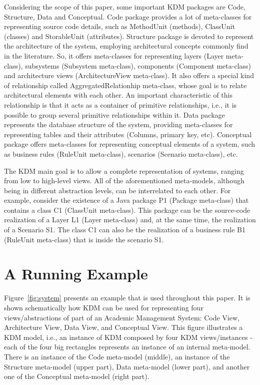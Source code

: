 Considering the scope of this paper, some important KDM packages are Code, Structure, Data and Conceptual. Code package provides a lot of meta-classes for representing source code details, such as MethodUnit (methods), ClassUnit (classes) and StorableUnit (attributes). Structure package is devoted to represent the architecture of the system, employing architectural concepts commonly find in the literature. So, it offers meta-classes for representing layers (Layer meta-class), subsystems (Subsystem meta-class), components (Component meta-class) and architecture views (ArchitectureView meta-class). It also offers a special kind of relationship called AggregatedRelationhip meta-class, whose goal is to relate architectural elements with each other. An important characteristic of this relationship is that it acts as a container of primitive relationships, i.e., it is possible to group several primitive relationships within it. Data package represents the database structure of the system, providing meta-classes for representing tables and their attributes (Columns, primary key, etc). Conceptual package offers meta-classes for representing conceptual elements of a system, such as business rules (RuleUnit meta-class), scenarios (Scenario meta-class), etc. 

The KDM main goal is to allow a complete representation of systems, ranging from low to high-level views. All of the aforementioned meta-models, although being in different abstraction levels, can be interrelated to each other. For example, consider the existence of a Java package P1 (Package meta-class) that contains a class C1 (ClassUnit meta-class). This package can be the source-code realization of a Layer L1 (Layer meta-class) and, at the same time, the realization of a Scenario S1. The class C1 can also be the realization of a business rule B1 (RuleUnit meta-class) that is inside the scenario S1. 

\section{A Running Example}\label{sec:running_example}

Figure~\ref{fig:system} presents an example that is used throughout this paper. It is shown schematically how KDM can be used for representing four views/abstractions of part of an Academic Management System: Code View, Architecture View, Data View, and Conceptual View. This figure illustrates a KDM model, i.e., an instance of KDM composed by four KDM views/instances - each of the four big rectangles represents an instance of an internal meta-model. There is an instance of the Code meta-model (middle), an instance of the Structure meta-model (upper part), Data meta-model (lower part), and another one of the Conceptual meta-model (right part). 

